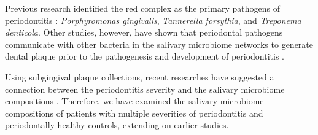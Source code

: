 \documentclass[11pt, a4paper, onecolumn, oneside]{report}
\begin{document}
            Previous research identified the red complex as the primary pathogens of periodontitis \cite{Periodontitis-14}: \textit{Porphyromonas gingivalis}, \textit{Tannerella forsythia}, and \textit{Treponema denticola}. Other studies, however, have shown that periodontal pathogens communicate with other bacteria in the salivary microbiome networks to generate dental plaque prior to the pathogenesis and development of periodontitis \cite{Periodontitis-15, Periodontitis-16, Periodontitis-17}.

            Using subgingival plaque collections, recent researches have suggested a connection between the periodontitis severity and the salivary microbiome compositions \cite{Periodontitis-9, Periodontitis-10, Periodontitis-11}. Therefore, we have examined the salivary microbiome compositions of patients with multiple severities of periodontitis and periodontally healthy controls, extending on earlier studies.
\end{document}
